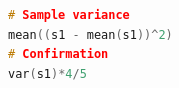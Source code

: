 \begin{lstlisting}[language=c++,label={code:20_03},caption={Code for calculating sample variance}]
# Sample variance
mean((s1 - mean(s1))^2)
# Confirmation
var(s1)*4/5
\end{lstlisting}

